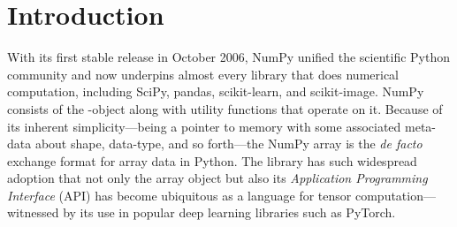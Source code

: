\section{Introduction}



With its first stable release in October 2006, NumPy unified
the scientific Python community and now underpins almost every library
that does numerical computation, including SciPy\cite{virtanen2019scipy},
pandas\cite{mckinney-proc-scipy-2010}, scikit-learn\cite{pedregosa2011scikit},
and scikit-image\cite{vanderwalt2014scikit}.
NumPy consists of the -object along with utility functions that
operate on it.
Because of its inherent simplicity—being a pointer to memory with some
associated meta-data about shape, data-type, and so forth—the NumPy array is
the {\it de facto} exchange format for array data in Python.
The library has such widespread adoption that not only the array object but also its
{\it Application Programming Interface} (API) has become ubiquitous as
a language for tensor computation---witnessed by its use in popular
deep learning libraries such as PyTorch\cite{pytorch}.

